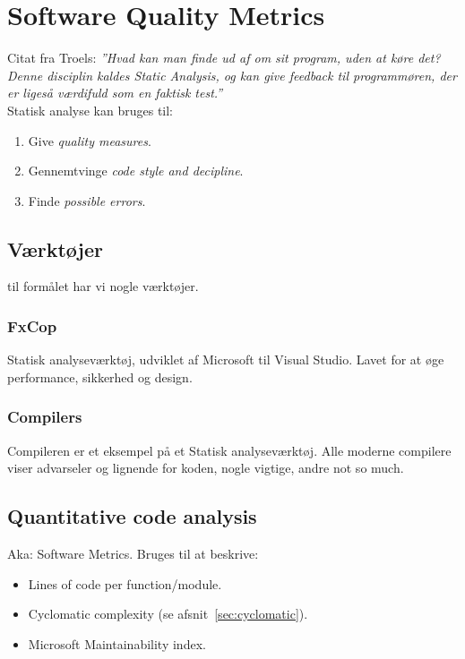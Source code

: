 \section{Software Quality Metrics}
Citat fra Troels: \textit{''Hvad kan man finde ud af om sit program, uden at køre det? Denne disciplin kaldes Static Analysis, og kan give feedback til programmøren, der er ligeså værdifuld som en faktisk test.''}\\

Statisk analyse kan bruges til: 

\begin{enumerate}
	\item Give \textit{quality measures}.
	\item Gennemtvinge \textit{code style and decipline}.
	\item Finde \textit{possible errors}.
\end{enumerate}

\subsection{Værktøjer} til formålet har vi nogle værktøjer.

\subsubsection{FxCop}
Statisk analyseværktøj, udviklet af Microsoft til Visual Studio. Lavet for at øge performance, sikkerhed og design.

\subsubsection{Compilers}
Compileren er et eksempel på et Statisk analyseværktøj. Alle moderne compilere viser advarseler og lignende for koden, nogle vigtige, andre not so much.

\subsection{Quantitative code analysis}
Aka: Software Metrics. Bruges til at beskrive: 

\begin{itemize}
	\item Lines of code per function/module.
	\item Cyclomatic complexity (se afsnit~\ref{sec:cyclomatic}).
	\item Microsoft Maintainability index.
\end{itemize}

